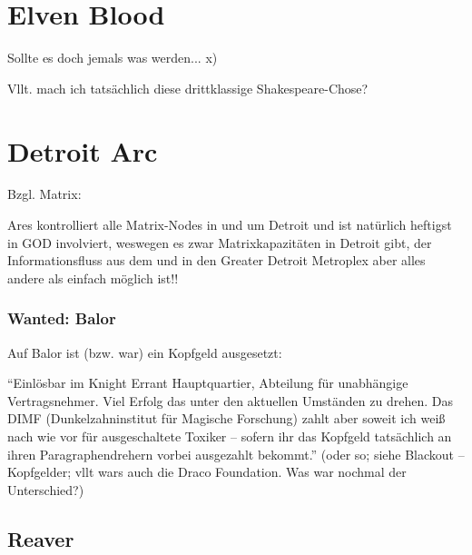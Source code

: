 \section{Elven Blood}

Sollte es doch jemals was werden... x)

Vllt. mach ich tatsächlich diese drittklassige Shakespeare-Chose?










\section{Detroit Arc}
 
Bzgl. Matrix:
 
Ares kontrolliert alle Matrix-Nodes in und um Detroit und ist natürlich heftigst in GOD involviert, weswegen es zwar Matrixkapazitäten in Detroit gibt, der Informationsfluss aus dem und in den Greater Detroit Metroplex aber alles andere als einfach möglich ist!!


\subsubsection{Wanted: Balor}

Auf Balor ist (bzw. war) ein Kopfgeld ausgesetzt:

``Einlösbar im Knight Errant Hauptquartier, Abteilung für unabhängige Vertragsnehmer. Viel Erfolg das unter den aktuellen Umständen zu drehen. Das DIMF (Dunkelzahninstitut für Magische Forschung) zahlt aber soweit ich weiß nach wie vor für ausgeschaltete Toxiker -- sofern ihr das Kopfgeld tatsächlich an ihren Paragraphendrehern vorbei ausgezahlt bekommt.'' (oder so; siehe Blackout -- Kopfgelder; vllt wars auch die Draco Foundation. Was war nochmal der Unterschied?)


\subsection{Reaver}

